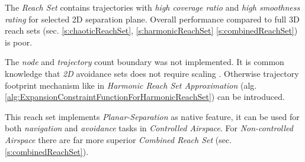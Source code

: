 The \emph{Reach Set} contains trajectories with \emph{high coverage ratio} and \emph{high smoothness rating} for selected 2D separation plane. Overall performance compared to full 3D reach sets (sec. \ref{s:chaoticReachSet}, \ref{s:harmonicReachSet} \ref{s:combinedReachSet}) is poor. 

The \emph{node} and \emph{trajectory} count boundary was not implemented. It is common knowledge that \emph{2D} avoidance sets does not require scaling \cite{marston2015acas}. Otherwise trajectory footprint mechanism like in \emph{Harmonic Reach Set Approximation} (alg. \ref{alg:ExpansionConstraintFunctionForHarmonicReachSet}) can be introduced.

This reach set implements \emph{Planar-Separation} as native feature, it can be used for both \emph{navigation} and \emph{avoidance} tasks in \emph{Controlled Airspace}. For \emph{Non-controlled Airspace} there are far more superior \emph{Combined Reach Set} (sec. \ref{s:combinedReachSet}).

